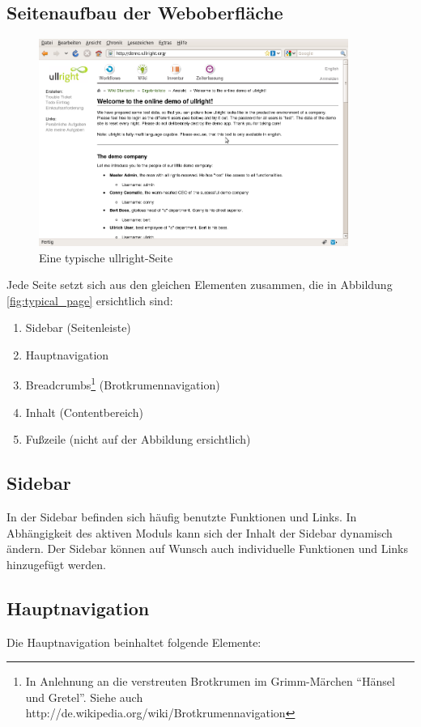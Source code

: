 \documentclass[article, a4paper, oneside, 11pt]{memoir}
\begin{document}
\subsection{Seitenaufbau der Weboberfläche}

\begin{figure}[htp]
\centering
\includegraphics[width=0.9\textwidth]{figures/ullrightgermanexport-img3.png}
\caption{Eine typische ullright-Seite}
\label{fig:typical_page}
\end{figure}
Jede Seite setzt sich aus den gleichen Elementen zusammen, die in Abbildung \vref{fig:typical_page} ersichtlich sind:

\begin{enumerate}
\item Sidebar (Seitenleiste)
\item Hauptnavigation
\item Breadcrumbs\footnote{In Anlehnung an die verstreuten Brotkrumen im Grimm-Märchen "`Hänsel und Gretel"'.  Siehe auch http://de.wikipedia.org/wiki/Brotkrumennavigation} (Brotkrumennavigation)
\item Inhalt (Contentbereich)
\item Fußzeile (nicht auf der Abbildung ersichtlich)
\end{enumerate}
\subsection{Sidebar}
In der Sidebar befinden sich häufig benutzte Funktionen und Links. In Abhängigkeit des aktiven Moduls kann sich der Inhalt der Sidebar dynamisch ändern. Der Sidebar können auf Wunsch auch individuelle Funktionen und Links hinzugefügt werden.

\subsection{Hauptnavigation}
Die Hauptnavigation beinhaltet folgende Elemente:
\end{document}
